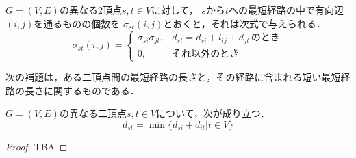 \begin{lemma}
  $G=(V,E)$の異なる2頂点$s,t \in V$に対して，
  $s$から$t$への最短経路の中で有向辺$(i,j)$を通るものの個数を
  $\sigma_{st}(i,j)$とおくと，それは次式で与えられる．
  \begin{equation*}
    \sigma_{st}(i,j)=
    \left\{
    \begin{array}{ll}
      \sigma_{si} \sigma_{jt}, & d_{st}=d_{si}+l_{ij}+d_{jt}\,\mbox{のとき} \\
      0, & \mbox{それ以外のとき}
    \end{array}
    \right.
  \end{equation*}
  \label{lemma:4}
\end{lemma}

次の補題は，ある二頂点間の最短経路の長さと，その経路に含まれる短い最短経路の長さに関するものである．
\begin{lemma}
  \label{lemma:distance-of-path}
  $G=(V,E)$の異なる二頂点$s,t\in V$について，次が成り立つ．
  \begin{equation*}
    d_{st}=\min\{d_{si}+d_{it}|i\in V\}
  \end{equation*}
\end{lemma}
\begin{proof}
  TBA
\end{proof}


